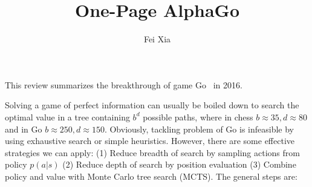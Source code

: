 \documentclass[11pt]{article}
\begin{document}
\title{One-Page AlphaGo}
\author{Fei Xia}
\date{}

\maketitle
This review summarizes the breakthrough of game Go~\cite{Silver_2016} in 2016.

Solving a game of perfect information can usually be boiled down to search the optimal value in a tree containing $b^d$ possible paths, where in chess $b\approx 35, d\approx 80$ and in Go $b\approx 250, d\approx 150$. Obviously, tackling problem of Go is infeasible by using exhaustive search or simple heuristics. However, there are some effective strategies we can apply: (1) Reduce breadth of search by sampling actions from policy $p(a|s)$ (2) Reduce depth of search by position evaluation (3) Combine policy and value with Monte Carlo tree search (MCTS). The general steps are:
\end{document}
